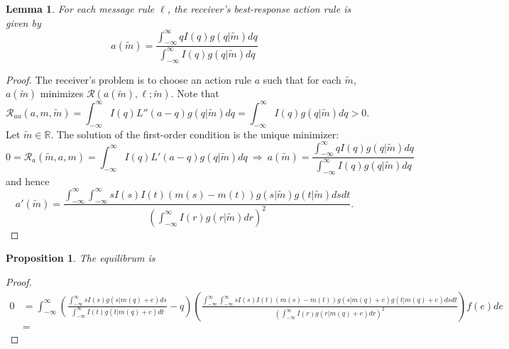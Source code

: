\documentclass[12pt]{article}
\newtheorem{lemma}{Lemma}
\newtheorem{proposition}{Proposition}
\begin{document}
\begin{landscape}
\begin{lemma}
For each message rule $\ell$, the receiver's best-response action rule is given by
\begin{equation}
a(\tilde{m})=\frac{\int_{-\infty}^{\infty}{qI(q)g(q|\tilde{m})dq}}{\int_{-\infty}^{\infty}{I(q)g(q|\tilde{m})dq}}
\end{equation}
\end{lemma}
\begin{proof}
The receiver's problem is to choose an action rule $a$ such that for each $\tilde{m}$, $a(\tilde{m})$ minimizes $\mathcal{R}(a(\tilde{m}),\ell;\tilde{m})$. Note that 
\begin{equation}
\mathcal{R}_{aa}(a,m,\tilde{m})=\int_{-\infty}^{\infty}{I(q)L''(a-q)g(q|\tilde{m})dq}=\int_{-\infty}^{\infty}{I(q)g(q|\tilde{m})dq}>0.
\end{equation}
Let $\tilde{m}\in\mathbb{R}$. The solution of the first-order condition is the unique minimizer:
\begin{equation}
0=\mathcal{R}_{a}(\tilde{m},a,m)=\int_{-\infty}^{\infty}{I(q)L'(a-q)g(q|\tilde{m})dq}\:\Rightarrow\:a(\tilde{m})=\frac{\int_{-\infty}^{\infty}{qI(q)g(q|\tilde{m})dq}}{\int_{-\infty}^{\infty}{I(q)g(q|\tilde{m})dq}}
\end{equation}
and hence
\begin{equation}
a'(\tilde{m})=\frac{\int_{-\infty}^{\infty}{\int_{-\infty}^{\infty}{sI(s)I(t)(m(s)-m(t))g(s|\tilde{m})g(t|\tilde{m})dsdt}}}{\left(\int_{-\infty}^{\infty}{I(r)g(r|\tilde{m})dr}\right)^{2}}.
\end{equation}
\end{proof}

\begin{proposition}
The equilibrum is
\end{proposition}
\begin{proof}
\begin{align}
0&=\int_{-\infty}^{\infty}{\left(\frac{\int_{-\infty}^{\infty}{sI(s)g(s|m(q)+e)ds}}{\int_{-\infty}^{\infty}{I(t)g(t|m(q)+e)dt}}-q\right)\left(\frac{\int_{-\infty}^{\infty}{\int_{-\infty}^{\infty}{sI(s)I(t)(m(s)-m(t))g(s|m(q)+e)g(t|m(q)+e)dsdt}}}{\left(\int_{-\infty}^{\infty}{I(r)g(r|m(q)+e)dr}\right)^{2}}\right)f(e)de}\\
&=
\end{align}
\end{proof}
\end{landscape}
\end{document}
